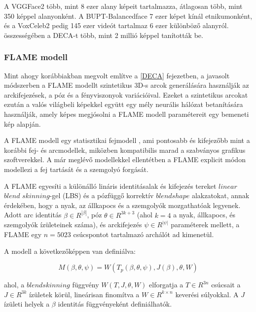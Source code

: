 \documentclass[12pt,a4]{article}
\begin{document}
                A VGGFace2 több, mint 8 ezer alany képeit tartalmazza, átlagosan több,
     	          mint 350 képpel alanyonként. A BUPT-Balancedface 7 ezer képet kínál
     	          etnikumonként, és a VoxCeleb2 pedig 145 ezer videót tartalmaz 6 ezer
     	          különböző alanyról. összességében a DECA-t több, mint 2 millió képpel tanították
     	          be.

            \subsubsection{FLAME modell}

                Mint ahogy korábbiakban megvolt említve a \ref{DECA} fejezetben, a javasolt módszerben a FLAME modellt szintetikus 3D-s arcok generálására használják  az arckifejezések, a póz és a fényviszonyok variációival. Ezeket a szintetikus arcokat ezután a valós világbeli képekkel együtt egy mély neurális hálózat betanítására használják, amely képes megjósolni a FLAME modell paramétereit egy bemeneti kép alapján.

                A FLAME modell egy statisztikai fejmodell \cite{flame}, ami pontosabb és kifejezőbb mint a korábbi fej- és arcmodellek, miközben kompatibilis marad a szabványos grafikus szoftverekkel. A már meglévő modellekkel ellentétben a FLAME explicit módon modellezi a fej tartását és a szemgolyó forgását.

                A FLAME egyesíti a különálló lináris identitásalak és kifejezés tereket $linear$ $blend$ $skinning$-gel (LBS) és a pózfüggő korrektív $blendshape$ alakzatokat, annak érdekében, hogy a nyak, az állkapocs és a szemgolyók mozgathatóak legyenek. Adott arc identitás $\beta \in R^{|\beta|}$, póz $\theta \in R^{3k+3}$ (ahol $k = 4$ a nyak, állkapocs, és szemgolyók ízületeinek száma), és arckifejezés $\psi \in R^{|\psi|}$ paraméterek mellett, a FLAME egy $n = 5023 $ csúcspontot tartalmazó archálót ad kimenetül.

                A modell a következőképpen van definiálva: 

                \begin{equation*}
                    M (\beta, \theta, \psi) = W (T_{p}(\beta, \theta, \psi), J(\beta), \theta, W)
                \end{equation*}

                ahol, a $blendskinning$ függvény $W (T, J, θ, W)$ elforgatja a  $T \in R^{3n}$ csúcsait a $J \in R^{3k}$ ízületek körül, lineárisan finomítva a $W \in R^{k\times n}$ keverési súlyokkal. A $J$ ízületi helyek a $\beta$ identitás függvényeként definiálhatók.
\end{document}
